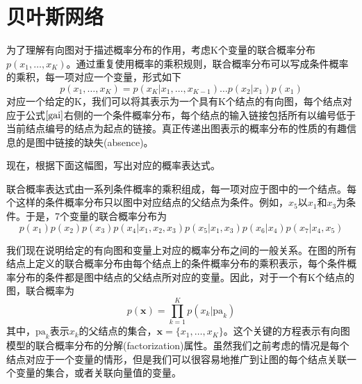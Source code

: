 \section{贝叶斯网络}
为了理解有向图对于描述概率分布的作用，考虑K个变量的联合概率分布$p(x_1,\dots,x_K)$。通过重复使用概率的乘积规则，联合概率分布可以写成条件概率的乘积，每一项对应一个变量，形式如下 
\begin{equation}
\label{gai}
	p(x_1,\dots,x_K)=p(x_K|x_1,\dots,x_{K-1})\dots p(x_2|x_1)p(x_1)
\end{equation}
对应一个给定的K，我们可以将其表示为一个具有K个结点的有向图，每个结点对应于公式$\ref{gai}$右侧的一个条件概率分布，每个结点的输入链接包括所有以编号低于当前结点编号的结点为起点的链接。真正传递出图表示的概率分布的性质的有趣信息的是图中链接的缺失(absence)。

现在，根据下面这幅图，写出对应的概率表达式。
\begin{center}
\end{center}
联合概率表达式由一系列条件概率的乘积组成，每一项对应于图中的一个结点。每个这样的条件概率分布只以图中对应结点的父结点为条件。例如，$x_5$以$x_1$和$x_3$为条件。于是，7个变量的联合概率分布为
\begin{equation}
	p(x_1)p(x_2)p(x_3)p(x_4|x_1,x_2,x_3)p(x_5|x_1,x_3)p(x_6|x_4)p(x_7|x_4,x_5)
\end{equation}

我们现在说明给定的有向图和变量上对应的概率分布之间的一般关系。在图的所有结点上定义的联合概率分布由每个结点上的条件概率分布的乘积表示，每个条件概率分布的条件都是图中结点的父结点所对应的变量。因此，对于一个有K个结点的图，联合概率为
\begin{equation}
\label{fen}
	p(\boldsymbol{x})=\prod_{k=1}^{K}p(x_k|\textrm{pa}_k)
\end{equation}
其中，$\textrm{pa}_k$表示$x_k$的父结点的集合，$\boldsymbol{x}=\{x_1,\dots,x_K \}$。这个关键的方程表示有向图模型的联合概率分布的分解(factorization)属性。虽然我们之前考虑的情况是每个结点对应于一个变量的情形，但是我们可以很容易地推广到让图的每个结点关联一个变量的集合，或者关联向量值的变量。

